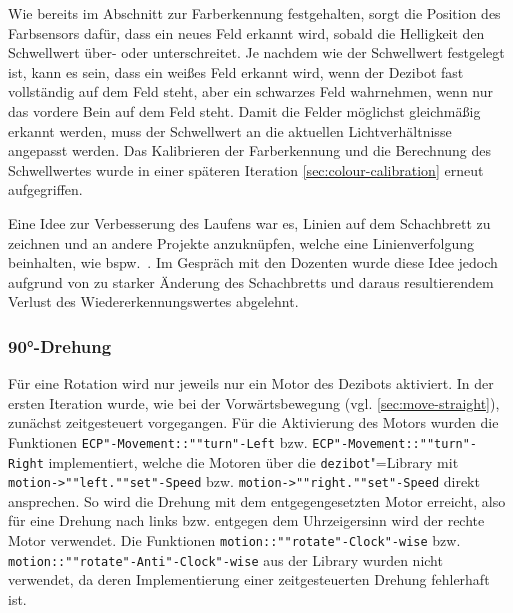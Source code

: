 \begin{listing}[h]
    \inputminted{cpp}{../assets/code/ECPMovement-moveToNextField.cpp}
    \caption{Code"=Ausschnitt zur \texttt{ECP"-Movement::""move"-To"-Next"-Field}"=Funktion.}
    \label{code:move-to-next-field}
\end{listing}

Wie bereits im Abschnitt zur Farberkennung festgehalten, sorgt die Position des Farbsensors dafür, dass ein neues Feld erkannt wird, sobald die Helligkeit den Schwellwert über- oder unterschreitet. Je nachdem wie der Schwellwert festgelegt ist, kann es sein, dass ein weißes Feld erkannt wird, wenn der Dezibot fast vollständig auf dem Feld steht, aber ein schwarzes Feld wahrnehmen, wenn nur das vordere Bein auf dem Feld steht. Damit die Felder möglichst gleichmäßig erkannt werden, muss der Schwellwert an die aktuellen Lichtverhältnisse angepasst werden. Das Kalibrieren der Farberkennung und die Berechnung des Schwellwertes wurde in einer späteren Iteration \autoref{sec:colour-calibration} erneut aufgegriffen. 

Eine Idee zur Verbesserung des Laufens war es, Linien auf dem Schachbrett zu zeichnen und an andere Projekte anzuknüpfen, welche eine Linienverfolgung beinhalten, wie bspw.~\cite{antonovSnskorpion2DezibotLabyrinthSolver2025}. Im Gespräch mit den Dozenten wurde diese Idee jedoch aufgrund von zu starker Änderung des Schachbretts und daraus resultierendem Verlust des Wiedererkennungswertes abgelehnt. 


\subsubsection{90°-Drehung}
\label{sec:turn-90}

Für eine Rotation wird nur jeweils nur ein Motor des Dezibots aktiviert. In der ersten Iteration wurde, wie bei der Vorwärtsbewegung (vgl. \autoref{sec:move-straight}), zunächst zeitgesteuert vorgegangen. Für die Aktivierung des Motors wurden die Funktionen \texttt{ECP"-Movement::""turn"-Left} bzw. \texttt{ECP"-Movement::""turn"-Right} implementiert, welche die Motoren über die \texttt{dezibot}"=Library mit \texttt{motion->""left.""set"-Speed} bzw. \texttt{motion->""right.""set"-Speed} direkt ansprechen. So wird die Drehung mit dem entgegengesetzten Motor erreicht, also für eine Drehung nach links bzw. entgegen dem Uhrzeigersinn wird der rechte Motor verwendet. Die Funktionen \texttt{motion::""rotate"-Clock"-wise} bzw. \texttt{motion::""rotate"-Anti"-Clock"-wise} aus der Library wurden nicht verwendet, da deren Implementierung einer zeitgesteuerten Drehung fehlerhaft ist.

